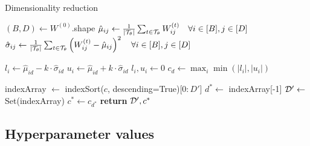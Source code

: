 \begin{algorithm} %
	\caption{Dimensionality reduction} %
	\label{alg:retained-set} %
	\begin{algorithmic} %
		
		\State $(B, D) \gets W^{(0)}$.shape
		\State $\hat{\mu}_{ij} \gets \frac{1}{|\mathcal{T}_\theta|} \sum_{t \in \mathcal{T}_\theta} W_{ij}^{(t)} \quad \forall i \in [B], j \in [D]$
		\State $\hat{\sigma}_{ij} \gets \frac{1}{|\mathcal{T}_\theta|} \sum_{t \in \mathcal{T}_\theta} \left( W_{ij}^{(t)} - \hat{\mu}_{ij} \right)^2 \quad \forall i \in [B], j \in [D]$
		
		\item[]
		
		\State $l_i \gets \hat{\mu}_{id} - k \cdot \hat{\sigma}_{id}$
		\State $u_i \gets \hat{\mu}_{id} + k \cdot \hat{\sigma}_{id}$
		\State $l_i, u_i \gets 0$
		\EndIf
		\EndFor
		\State $c_d \gets \max_i \min\left(|l_i|, |u_i| \right)$
		\EndFor
		
		\item[]
		
		\State indexArray $\gets$ indexSort($c$, descending=True)[$0:D'$]
		\State $d^* \gets$ indexArray[-1]
		\State $\mathcal{D}' \gets $ Set(indexArray)
		\State $c^* \gets c_{d^*}$
		\State \textbf{return} $\mathcal{D}', c^*$
		\EndProcedure
	\end{algorithmic}
\end{algorithm}

\FloatBarrier
\subsection{Hyperparameter values}
\label{appdx:hyperparams}

\begin{table}[!h]
	\centering
	\caption{Hyper-parameter values for each experiment.}
	\label{tab:hyperparams}
\end{table}

